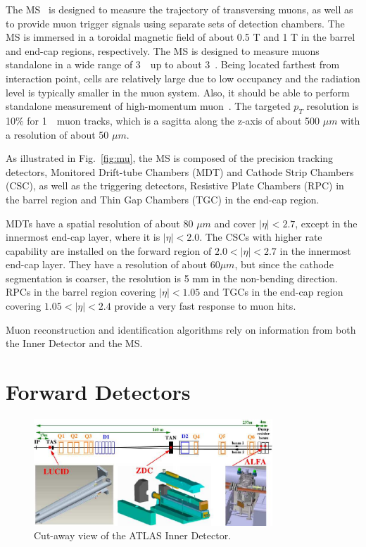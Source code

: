 \par The MS~\cite{CERN-LHCC-97-022} is designed to measure the trajectory of transversing muons, as well as to provide muon trigger signals using separate sets of detection chambers. The MS is immersed in a toroidal magnetic field of about 0.5 T and 1 T in the barrel and end-cap regions, respectively. The MS is designed to measure muons standalone in a wide range of 3~\GeV~up to about 3~\TeV. Being located farthest from interaction point, cells are relatively large due to low occupancy and the radiation level is typically smaller in the muon system. Also, it should be able to perform standalone measurement of high-momentum muon~\cite{muon}.
The targeted $p_T$ resolution is 10\% for 1~\TeV~muon tracks, which is a sagitta along the z-axis of about 500 $\mu m$ with a resolution of about 50 $\mu m$.

\par As illustrated in Fig.~\ref{fig:mu}, the MS is composed of the precision tracking detectors, Monitored Drift-tube Chambers (MDT) and Cathode Strip Chambers (CSC), as well as the triggering detectors, Resistive Plate Chambers (RPC) in the barrel region and Thin Gap Chambers (TGC) in the end-cap region.

\par MDTs have a spatial resolution of about 80 $\mu m$ and cover $|\eta| < 2.7$, except in the innermost end-cap layer, where it is $|\eta| < 2.0$. The CSCs with higher rate capability are installed on the forward region of $2.0 < |\eta| < 2.7$ in the innermost end-cap layer. They have a resolution of about 60$\mu m$, but since the cathode segmentation is coarser, the resolution is 5 mm in the non-bending direction. RPCs in the barrel region covering $|\eta| < 1.05$ and TGCs in the end-cap region covering $1.05 < |\eta| < 2.4$ provide a very fast response to muon hits.

\par Muon reconstruction and identification algorithms rely on information from both the Inner Detector and the MS.

\section{Forward Detectors}
\label{sec:for}
\begin{figure}[htbp]
    \centering
    \includegraphics[width=0.8\textwidth]{chapters/c4/figures/forward}
    \caption{Cut-away view of the ATLAS Inner Detector.}
    \label{fig:forward}
\end{figure}

